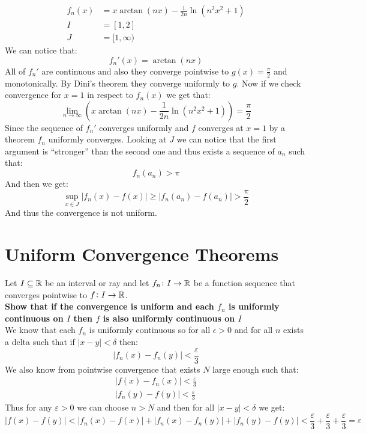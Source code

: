 \documentclass[11pt,a4paper]{article}
\begin{document}
	\begin{align*}
		f_n(x) &= x\arctan(nx)-\frac{1}{2n}\ln(n^2x^2+1) \\
		I &= [1,2] \\
		J &= [1,\infty)
	\end{align*}
	We can notice that:
	\[
		f_n'(x) = \arctan(nx)
	\]
	All of $f_n'$ are continuous and also they converge pointwise to 
	$g(x) = \frac{\pi}{2}$ and monotonically. By Dini's theorem they
	converge uniformly to $g$. Now if we check convergence for $x=1$
	in respect to $f_n(x)$ we get that:
	\[
		\lim_{n\to\infty}{
		\left(
		x\arctan(nx)-\frac{1}{2n}\ln(n^2x^2+1)
		\right)} = 
		\frac{\pi}{2}
	\]
	Since the sequence of $f_n'$ converges uniformly and $f$ converges at
	$x=1$ by a theorem $f_n$ uniformly converges. Looking at $J$ we
	can notice that the first argument is ``stronger'' than the second
	one and thus exists a sequence of $a_n$ such that:
	\[
		f_n(a_n) > \pi
	\]
	And then we get:
	\[
		\sup_{x\in J}|f_n(x) - f(x)| \geq 
		|f_n(a_n) - f(a_n)| >
		\frac{\pi}{2}
	\]
	And thus the convergence is not uniform.
	
	\newpage
	
	\section{Uniform Convergence Theorems}
	Let $I\subseteq\mathbb{R}$ be an interval or ray and let $f_n\colon I\to\mathbb{R}$ be a 
	function sequence that converges pointwise to $f\colon I\to\mathbb{R}$. \\
	\textbf{Show that if the convergence is uniform and each $f_n$ is
	uniformly continuous on $I$ then $f$ is also uniformly continuous on $I$}
	\\
	We know that each $f_n$ is uniformly continuous so for all $\epsilon >0$
	and for all $n$ exists a delta such that if $|x-y| < \delta$ then:
	\[
		|f_n(x) - f_n(y)| < \frac{\varepsilon}{3}
	\]
	We also know from pointwise convergence that exists $N$ large enough such
	that:
	\begin{align*}
		|f(x) - f_n(x)| < \frac{\varepsilon}{3} \\
		|f_n(y) - f(y)| < \frac{\varepsilon}{3}
	\end{align*}
	Thus for any $\varepsilon > 0$ we can choose $n > N$ and then for
	all $|x-y| < \delta$ we get:
	\[
		|f(x) - f(y)| < 
		|f_n(x) - f(x)| + |f_n(x) - f_n(y)| + |f_n(y) - f(y)| < 
		\frac{\varepsilon}{3} + 
		\frac{\varepsilon}{3} + \frac{\varepsilon}{3} = \varepsilon
	\]
	
	\newpage
	
\end{document}

